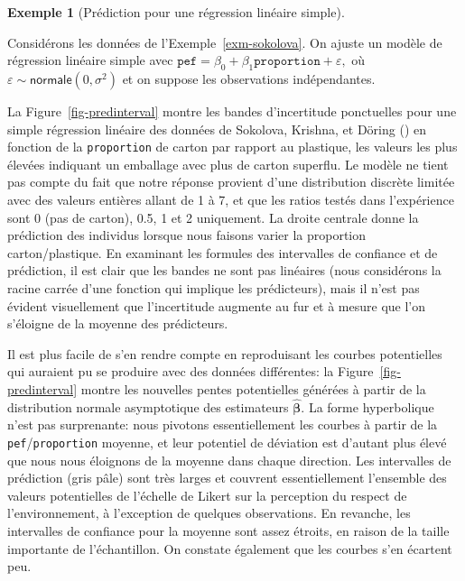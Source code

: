 \documentclass[
  11pt,
  letterpaper,
]{scrbook}
\theoremstyle{plain}
\theoremstyle{plain}
\theoremstyle{definition}
\newtheorem{example}{Exemple}[chapter]
\theoremstyle{definition}
\theoremstyle{remark}
\begin{document}
\begin{example}[Prédiction pour une régression linéaire
simple]\protect\hypertarget{exm-sokolova-pred}{}\label{exm-sokolova-pred}

Considérons les données de l'Exemple~\ref{exm-sokolova}. On ajuste un
modèle de régression linéaire simple avec
\(\texttt{pef} = \beta_0 + \beta_1 \texttt{proportion} + \varepsilon,\)
où \(\varepsilon \sim \mathsf{normale}(0,\sigma^2)\) et on suppose les
observations indépendantes.

La Figure~\ref{fig-predinterval} montre les bandes d'incertitude
ponctuelles pour une simple régression linéaire des données de Sokolova,
Krishna, et Döring () en fonction de
la \texttt{proportion} de carton par rapport au plastique, les valeurs
les plus élevées indiquant un emballage avec plus de carton superflu. Le
modèle ne tient pas compte du fait que notre réponse provient d'une
distribution discrète limitée avec des valeurs entières allant de 1 à 7,
et que les ratios testés dans l'expérience sont 0 (pas de carton), 0.5,
1 et 2 uniquement. La droite centrale donne la prédiction des individus
lorsque nous faisons varier la proportion carton/plastique. En examinant
les formules des intervalles de confiance et de prédiction, il est clair
que les bandes ne sont pas linéaires (nous considérons la racine carrée
d'une fonction qui implique les prédicteurs), mais il n'est pas évident
visuellement que l'incertitude augmente au fur et à mesure que l'on
s'éloigne de la moyenne des prédicteurs.

Il est plus facile de s'en rendre compte en reproduisant les courbes
potentielles qui auraient pu se produire avec des données différentes:
la Figure~\ref{fig-predinterval} montre les nouvelles pentes
potentielles générées à partir de la distribution normale asymptotique
des estimateurs \(\widehat{\boldsymbol{\beta}}.\) La forme hyperbolique
n'est pas surprenante: nous pivotons essentiellement les courbes à
partir de la \texttt{pef}/\texttt{proportion} moyenne, et leur potentiel
de déviation est d'autant plus élevé que nous nous éloignons de la
moyenne dans chaque direction. Les intervalles de prédiction (gris pâle)
sont très larges et couvrent essentiellement l'ensemble des valeurs
potentielles de l'échelle de Likert sur la perception du respect de
l'environnement, à l'exception de quelques observations. En revanche,
les intervalles de confiance pour la moyenne sont assez étroits, en
raison de la taille importante de l'échantillon. On constate également
que les courbes s'en écartent peu.


\end{example}
\end{document}
